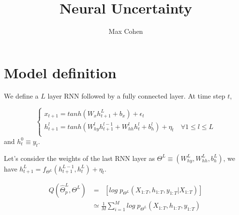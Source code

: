 \documentclass[11pt,a4paper]{report}
\begin{document}
\title{Neural Uncertainty}
\author{Max Cohen}
\maketitle


\chapter{Model definition}
We define a $L$ layer RNN followed by a fully connected layer. At time step $t$,

$$
    \left\{
    \begin{array}{ll}
        x_{t+1} = tanh(W_x h_{t+1}^L + b_x) + \epsilon_t                                                             \\
        h_{t+1}^l = tanh(W_{hy}^l h^{l-1}_{t+1} + W_{hh}^l h^{l}_{t} + b_h^l) + \eta_t \quad \forall 1 \leq l \leq L \\
    \end{array}
    \right.
$$
and $h_{t}^0 \equiv y_{t}$.

Let's consider the weights of the last RNN layer as $\Theta^L \equiv (W_{hy}^L, W_{hh}^L, b_h^L)$, we have
$h_{t+1}^L = f_{\Theta^L}(h_{t+1}^{L-1}, h_{t}^L) + \eta_t$.

\begin{align}
    Q(\hat \Theta^L_p, \Theta^L) & = \mathop{\mathbb{E}_{\hat \Theta^L_p}} \left[ log \; p_{\Theta^L}(X_{1:T}, h_{1:T}, y_{1:T} | X_{1:T}) \right] \\
                                 & \simeq \frac{1}{M} \sum_{i=1}^M  log \; p_{\Theta^L}(X_{1:T}, h_{1:T}, y_{1:T})
\end{align}
\end{document}
